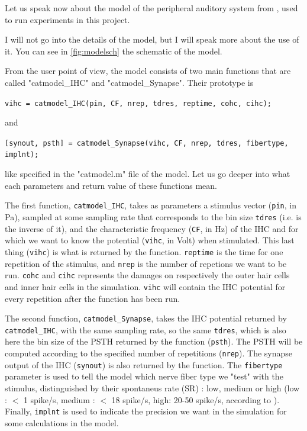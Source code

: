 Let us speak now about the model of the peripheral auditory system from 
\cite{Model1, Model2, Model3}, used to run experiments in this project. 

I will not go into the details of the model, but I will speak more about the use of it. 
You can see in \autoref{fig:modelsch} the schematic of the model.



From the user point of view, the model consists of two main functions 
that are called "catmodel\_IHC" and "catmodel\_Synapse". Their prototype is

\texttt{vihc = catmodel\_IHC(pin, CF, nrep, tdres, reptime, cohc, cihc);}

and

\texttt{[synout, psth] = catmodel\_Synapse(vihc, CF, nrep, tdres, fibertype, implnt);}

like specified in the "catmodel.m" file of the model. 
Let us go deeper into what each parameters and return value of these functions mean.

The first function, \texttt{catmodel\_IHC}, takes as parameters 
a stimulus vector (\texttt{pin}, in Pa), sampled at some sampling rate that corresponds 
to the bin size \texttt{tdres} (i.e. is the inverse of it), and 
the characteristic frequency (\texttt{CF}, in Hz) 
of the IHC and for which we want to know the potential 
(\texttt{vihc}, in Volt) when stimulated. 
This last thing (\texttt{vihc}) is what is returned by the function. 
\texttt{reptime} is the time for one repetition of the stimulus, 
and \texttt{nrep} is the number of repetions we want to be run. 
\texttt{cohc} and \texttt{cihc} represents the damages on respectively 
the outer hair cells and inner hair cells in the simulation.
\texttt{vihc} will contain the IHC potential for every repetition 
after the function has been run.

The second function, \texttt{catmodel\_Synapse}, 
takes the IHC potential returned by \texttt{catmodel\_IHC}, 
with the same sampling rate, so the same \texttt{tdres}, which is also here the bin size
of the PSTH returned by the function (\texttt{psth}). 
The PSTH will be computed according to the specified number of repetitions (\texttt{nrep}).
The synapse output of the IHC (\texttt{synout}) is also returned by the function.
The \texttt{fibertype} parameter is used to tell the model which nerve fiber type
we "test" with the stimulus, distinguished by their spontaneus rate (SR) : 
low, medium or high (low : $<$ 1 spike/s, medium : $<$ 18 spike/s, high: 20-50 spike/s, 
according to \cite{AuditoryNeuroscience}). %
Finally, \texttt{implnt} is used to indicate the precision we want in the simulation 
for some calculations in the model.

